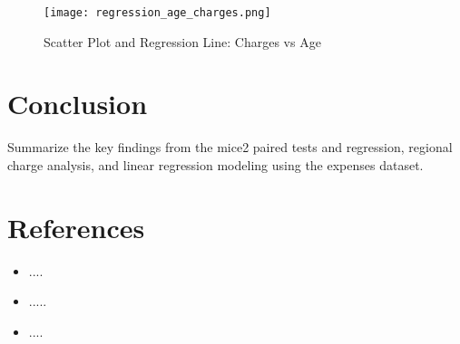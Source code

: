 \documentclass{article}
\begin{document}
\begin{figure}[H]
    \centering
    \texttt{[image: regression\_age\_charges.png]} %
    \caption{Scatter Plot and Regression Line: Charges vs Age}
\end{figure}

\section{Conclusion}
Summarize the key findings from the mice2 paired tests and regression, regional charge analysis, and linear regression modeling using the expenses dataset.

\section{References}
\begin{itemize}
    \item ....
    \item .....
    \item ....
\end{itemize}
\end{document}
